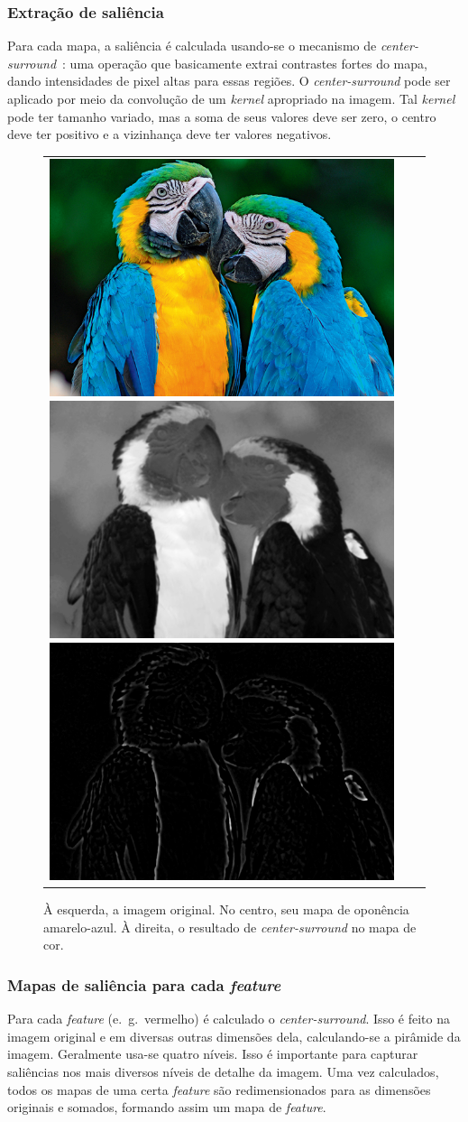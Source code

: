\documentclass[11pt]{article}
\newcommand{\tit}[1]{\textit{#1}}
\newcommand{\eg}{e.~g.~}
\begin{document}
\subsubsection{Extração de saliência}
Para cada mapa, a saliência é calculada usando-se o mecanismo de
\tit{center-surround}~\cite{Frintrop2006}:
uma operação que basicamente extrai contrastes fortes
do mapa, dando intensidades de pixel altas para essas regiões.
O \tit{center-surround} pode ser aplicado por meio da convolução de um
\tit{kernel} apropriado na imagem.
Tal \tit{kernel} pode ter tamanho variado, mas a soma de seus valores deve
ser zero, o centro deve ter positivo e a vizinhança deve ter valores
negativos.
\begin{figure}[H]
\begin{center}
		\begin{tabular} {ccc}
            \includegraphics[width=0.3\linewidth]{img/arara.jpg}
            \includegraphics[width=0.3\linewidth]{img/arara_y.png}
            \includegraphics[width=0.3\linewidth]{img/arara_y_cs.png}
		\end{tabular}
\end{center}
\caption{À esquerda, a imagem original. No centro, seu mapa de oponência
amarelo-azul. À direita, o resultado de \tit{center-surround}
no mapa de cor.}
\label{fig:extrfeat}
\end{figure}

\subsubsection{Mapas de saliência para cada \tit{feature}}
Para cada \tit{feature} (\eg vermelho) é calculado o \tit{center-surround}.
Isso é feito na imagem original e em diversas outras dimensões dela,
calculando-se a pirâmide da imagem. Geralmente usa-se quatro níveis.
Isso é importante para capturar saliências nos mais diversos níveis de detalhe
da imagem. Uma vez calculados, todos os mapas de uma certa \tit{feature}
são redimensionados para as dimensões originais e somados, formando assim
um mapa de \tit{feature}.
\end{document}
